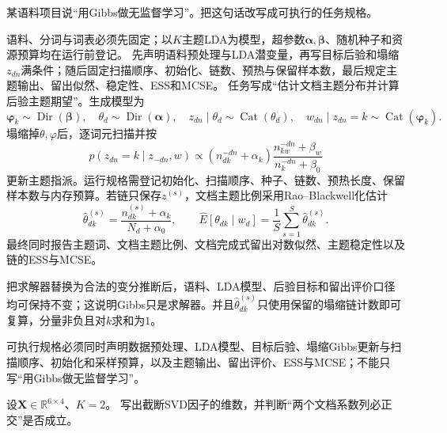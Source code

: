 \label{struct:V5-C08-CH32}
\begin{example}[对象、目标与求解器分层]\label{exm:V5-C08-layering}
某语料项目说“用Gibbs做无监督学习”。把这句话改写成可执行的任务规格。
\end{example}
\begin{solution}
\SolGiven 语料、分词与词表必须先固定；以$K$主题LDA为模型，超参数$\boldsymbol\alpha,\boldsymbol\beta$、随机种子和资源预算均在运行前登记。
\SolPlan 先声明语料预处理与LDA潜变量，再写目标后验和塌缩$z_{dn}$满条件；随后固定扫描顺序、初始化、链数、预热与保留样本数，最后规定主题输出、留出似然、稳定性、ESS和MCSE。
\SolDerive
任务写成“估计文档主题分布并计算后验主题期望”。生成模型为
\[
\boldsymbol\varphi_k\sim\operatorname{Dir}(\boldsymbol\beta),\quad
\theta_d\sim\operatorname{Dir}(\boldsymbol\alpha),\quad
z_{dn}\mid\theta_d\sim\operatorname{Cat}(\theta_d),\quad
w_{dn}\mid z_{dn}=k\sim\operatorname{Cat}(\boldsymbol\varphi_k).
\]
塌缩掉$\theta,\varphi$后，逐词元扫描并按
\[
p(z_{dn}=k\mid z_{-dn},w)
\propto
(n_{dk}^{-dn}+\alpha_k)
\frac{n_{kw}^{-dn}+\beta_w}{n_k^{-dn}+\beta_0}
\]
更新主题指派。运行规格需登记初始化、扫描顺序、种子、链数、预热长度、保留样本数与内存预算。若链只保存$z^{(s)}$，文档主题比例采用Rao--Blackwell化估计
\[
\widehat\theta_{dk}^{(s)}
=\frac{n_{dk}^{(s)}+\alpha_k}{N_d+\alpha_0},
\qquad
\widehat E[\theta_{dk}\mid w_d]
=\frac1S\sum_{s=1}^S\widehat\theta_{dk}^{(s)}.
\]
最终同时报告主题词、文档主题比例、文档完成式留出对数似然、主题稳定性以及链的ESS与MCSE。

\SolCheck 把求解器替换为合法的变分推断后，语料、LDA模型、后验目标和留出评价口径均可保持不变；这说明Gibbs只是求解器。并且$\widehat\theta_{dk}^{(s)}$只使用保留的塌缩链计数即可复算，分量非负且对$k$求和为$1$。

\SolAnswer 可执行规格必须同时声明数据预处理、LDA模型、目标后验、塌缩Gibbs更新与扫描顺序、初始化和采样预算，以及主题输出、留出评价、ESS与MCSE；不能只写“用Gibbs做无监督学习”。
\end{solution}
\begin{example}[LSA因子维数纠错]\label{exm:V5-C08-lsa-shape}
设$\boldsymbol X\in\mathbb R^{6\times4}$、$K=2$。
写出截断SVD因子的维数，并判断“两个文档系数列必正交”是否成立。
\end{example}
